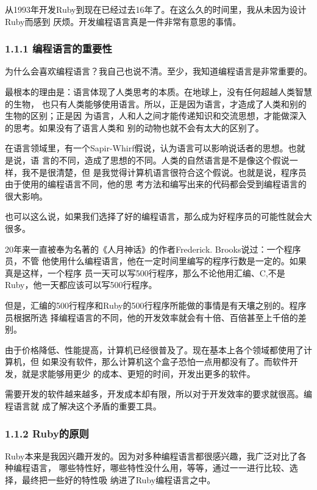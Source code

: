 \documentclass[color=cyan,mathpazo,titlestyle=hang]{elegantbook}
\begin{document}
从1993年开发Ruby到现在已经过去16年了。在这么久的时间里，我从未因为设计Ruby而感到
厌烦。开发编程语言真是一件非常有意思的事情。

\subsubsection{1.1.1 编程语言的重要性}
\label{sec:org146f0ec}

为什么会喜欢编程语言？我自己也说不清。至少，我知道编程语言是非常重要的。

最根本的理由是：语言体现了人类思考的本质。在地球上，没有任何超越人类智慧的生物，
也只有人类能够使用语言。所以，正是因为语言，才造成了人类和别的生物的区别；正是因
为语言，人和人之间才能传递知识和交流思想，才能做深入的思考。如果没有了语言人类和
别的动物也就不会有太大的区别了。

在语言领域里，有一个Sapir-Whirf假说，认为语言可以影响说话者的思想。也就是说，语
言的不同，造成了思想的不同。人类的自然语言是不是像这个假说一样，我不是很清楚，但
是我觉得计算机语言很符合这个假说。也就是说，程序员由于使用的编程语言不同，他的思
考方法和编写出来的代码都会受到编程语言的很大影响。

也可以这么说，如果我们选择了好的编程语言，那么成为好程序员的可能性就会大很多。

20年来一直被奉为名著的《人月神话》的作者Frederick. Brooks说过：一个程序员，不管
他使用什么编程语言，他在一定时间里编写的程序行数是一定的。如果真是这样，一个程序
员一天可以写500行程序，那么不论他用汇编、C,不是Ruby，他一天都应该可以写500行程序。

但是，汇编的500行程序和Ruby的500行程序所能做的事情是有天壤之别的。程序员根据所选
择编程语言的不同，他的开发效率就会有十倍、百倍甚至上千倍的差别。

由于价格降低、性能提高，计算机已经很普及了。现在基本上各个领域都使用了计算机，但
如果没有软件，那么计算机这个盒子恐怕一点用都没有了。而软件开发，就是求能够用更少
的成本、更短的时间，开发出更多的软件。

需要开发的软件越来越多，开发成本却有限，所以对于开发效率的要求就很高。编程语言就
成了解决这个矛盾的重要工具。

\subsubsection{1.1.2 Ruby的原则}
\label{sec:org8f98627}

Ruby本来是我因兴趣开发的。因为对多种编程语言都很感兴趣，我广泛对比了各种编程语言，
哪些特性好，哪些特性没什么用，等等，通过一一进行比较、选择，最终把一些好的特性吸
纳进了Ruby编程语言之中。
\end{document}
